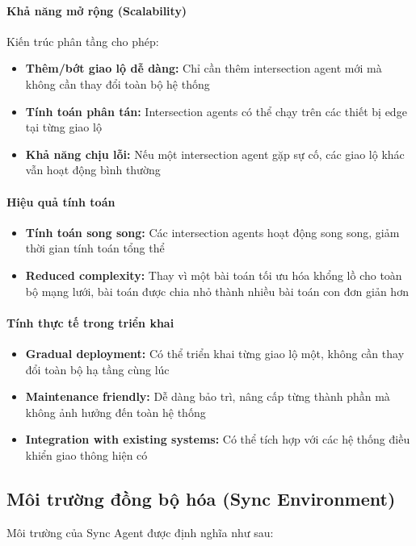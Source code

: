 \paragraph{Khả năng mở rộng (Scalability)}
Kiến trúc phân tầng cho phép:
\begin{itemize}
    \item \textbf{Thêm/bớt giao lộ dễ dàng:} Chỉ cần thêm intersection agent mới mà không cần thay đổi toàn bộ hệ thống
    \item \textbf{Tính toán phân tán:} Intersection agents có thể chạy trên các thiết bị edge tại từng giao lộ
    \item \textbf{Khả năng chịu lỗi:} Nếu một intersection agent gặp sự cố, các giao lộ khác vẫn hoạt động bình thường
\end{itemize}

\paragraph{Hiệu quả tính toán}
\begin{itemize}
    \item \textbf{Tính toán song song:} Các intersection agents hoạt động song song, giảm thời gian tính toán tổng thể
    \item \textbf{Reduced complexity:} Thay vì một bài toán tối ưu hóa khổng lồ cho toàn bộ mạng lưới, bài toán được chia nhỏ thành nhiều bài toán con đơn giản hơn
\end{itemize}

\paragraph{Tính thực tế trong triển khai}
\begin{itemize}
    \item \textbf{Gradual deployment:} Có thể triển khai từng giao lộ một, không cần thay đổi toàn bộ hạ tầng cùng lúc
    \item \textbf{Maintenance friendly:} Dễ dàng bảo trì, nâng cấp từng thành phần mà không ảnh hưởng đến toàn hệ thống
    \item \textbf{Integration with existing systems:} Có thể tích hợp với các hệ thống điều khiển giao thông hiện có
\end{itemize}

\subsection{Môi trường đồng bộ hóa (Sync Environment)}
Môi trường của Sync Agent được định nghĩa như sau:

